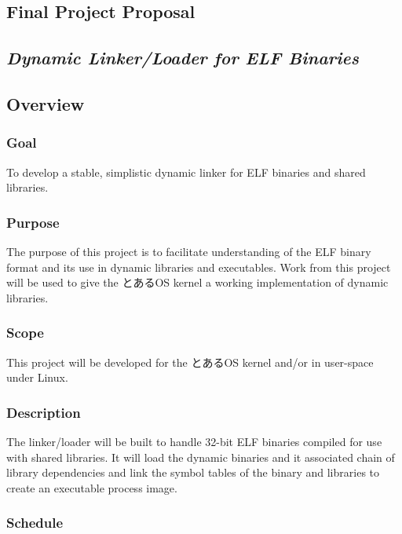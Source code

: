 \documentclass{article}
\begin{document}
\begin{CJK}{UTF8}{goth}

\section*{Final Project Proposal}
\subsection*{\emph{Dynamic Linker/Loader for ELF Binaries}}

\subsection*{Overview}

\subsubsection*{Goal}

To develop a stable, simplistic dynamic linker for ELF binaries and
shared libraries.

\subsubsection*{Purpose}

The purpose of this project is to facilitate understanding of the ELF
binary format and its use in dynamic libraries and executables. Work
from this project will be used to give the とあるOS kernel a working
implementation of dynamic libraries.

\subsubsection*{Scope}

This project will be developed for the とあるOS kernel and/or in
user-space under Linux.

\subsubsection*{Description}

The linker/loader will be built to handle 32-bit ELF binaries
compiled for use with shared libraries. It will load the dynamic
binaries and it associated chain of library dependencies and link
the symbol tables of the binary and libraries to create an
executable process image.

\subsubsection*{Schedule}


\end{CJK}
\end{document}
